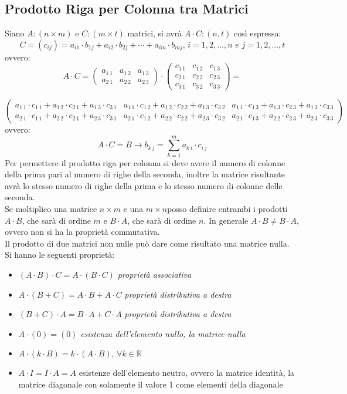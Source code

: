 \documentclass[a4paper,12pt, oneside]{book}
\begin{document}
\subsection{Prodotto Riga per Colonna tra Matrici}
Siano $A:(n\times m)$ e $C:(m\times t)$ matrici, si avrà $A\cdot C:(n,t)$ così espressa:
$$C=(c_{ij})=a_{i1}\cdot b_{1j}+a_{i2}\cdot b_{2j}+\cdots+a_{im}\cdot b_{mj},\, i=1,2,... ,n\,\, e\,\, j=1,2,... ,t$$
ovvero:
$$
	A\cdot C=
	\left(\begin{matrix}
			a_{1\,1} & a_{1\,2} & a_{1\,3} \\
			a_{2\,1} & a_{2\,2} & a_{2\,3}
		\end{matrix}\right)
	\cdot
	\left(\begin{matrix}
			c_{1\,1} & c_{1\,2} & c_{1\,3} \\
			c_{2\,1} & c_{2\,2} & c_{2\,3} \\
			c_{3\,1} & c_{3\,2} & c_{3\,3}
		\end{matrix}\right)=
$$

$$
	\left(\begin{matrix}
			a_{1\,1}\cdot c_{1\,1}+a_{1\,2}\cdot c_{2\,1}+a_{1\,3}\cdot c_{3\,1} & a_{1\,1}\cdot c_{1\,2}+a_{1\,2}\cdot c_{2\,2}+a_{1\,3}\cdot c_{3\,2} & a_{1\,1}\cdot c_{1\,3}+a_{1\,3}\cdot c_{2\,3}+a_{1\,3}\cdot c_{3\,3} \\
			a_{2\,1}\cdot c_{1\,1}+a_{2\,2}\cdot c_{2\,1}+a_{2\,3}\cdot c_{3\,1} & a_{2\,1}\cdot c_{1\,2}+a_{2\,2}\cdot c_{2\,2}+a_{2\,3}\cdot c_{3\,2} & a_{2\,1}\cdot c_{1\,3}+a_{2\,2}\cdot c_{2\,3}+a_{2\,3}\cdot c_{3\,3}
		\end{matrix}\right)
$$
ovvero:
$$ A\cdot C=B\rightarrow b_{k\,j}=\sum_{k=1}^{m} a_{k\,i}\cdot c_{i\,j}$$
Per permettere il prodotto riga per colonna si deve avere il numero di colonne della prima pari al numero di righe della seconda, inoltre la matrice risultante avrà lo stesso numero di righe della prima e lo stesso numero di colonne delle seconda.\\
Se moltiplico una matrice $n\times m$ e una $m\times n$posso definire entrambi i prodotti $A\cdot B$, che sarà di ordine $m$ e $B\cdot A$, che sarà di ordine $n$. In generale $A\cdot B \neq B\cdot A$, ovvero non si ha la proprietà commutativa.\\
Il prodotto di due matrici non nulle può dare come risultato una matrice nulla.\\
Si hanno le seguenti proprietà:
\begin{itemize}
	\item $(A\cdot B)\cdot C=A\cdot (B\cdot C)$ \textit{proprietà associativa}
	\item $A\cdot(B+C)=A\cdot B+A\cdot C$ \textit{proprietà distributiva  a destra}
	\item $(B+C)\cdot A=B\cdot A+C\cdot A$ \textit{proprietà distributiva a destra}
	\item $A\cdot (0)=(0)$ \textit{esistenza dell'elemento nullo, la matrice nulla}
	\item $A\cdot(k\cdot B)=k\cdot(A\cdot B),\, \forall k\in \mathbb{R}$
	\item $A\cdot I=I\cdot A=A$ {esistenze dell'elemento neutro, ovvero la matrice identità, la matrice diagonale con solamente il valore 1 come elementi della diagonale}
\end{itemize}
\end{document}
